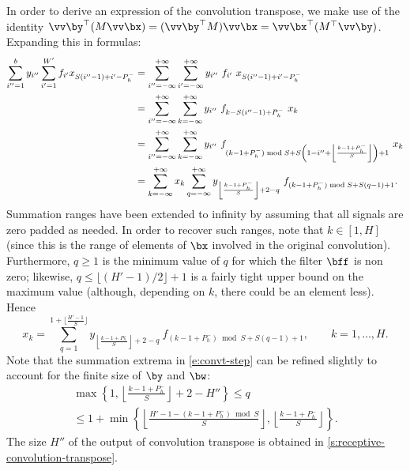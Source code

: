 In order to derive an expression of the convolution transpose,  we make use of the identity $\vv \by^\top (M \vv \bx) = (\vv \by^\top M) \vv\bx = \vv\bx^\top (M^\top \vv\by)$. Expanding this in formulas:
\begin{align*}
\sum_{i''=1}^b y_{i''} 
\sum_{i'=1}^{W'} f_{i'} x_{S (i''-1) + i'  -P_h^-}
&=
\sum_{i''=-\infty}^{+\infty}
\sum_{i'=-\infty}^{+\infty} 
y_{i''}\ f_{i'}\ x_{S (i''-1) + i'  -P_h^-}
\\
&=
\sum_{i''=-\infty}^{+\infty}
\sum_{k=-\infty}^{+\infty} 
y_{i''}\ f_{k-S(i'' -1) + P_h^-}\ x_{k}
\\
&=
\sum_{i''=-\infty}^{+\infty}
\sum_{k=-\infty}^{+\infty} 
y_{i''}%
\ %
f_{%
(k-1+ P_h^-) \bmod S +
S \left(1 -i''  + \left\lfloor \frac{k-1+ P_h^-}{S} \right\rfloor\right)+1
}\ x_{k}
\\
&=
\sum_{k=-\infty}^{+\infty} 
x_{k}
\sum_{q=-\infty}^{+\infty}
y_{\left\lfloor \frac{k-1+ P_h^-}{S} \right\rfloor + 2 - q}
\ %
f_{(k-1+ P_h^-)\bmod S +S(q - 1)+1}.
\end{align*}
Summation ranges have been extended to infinity by assuming that all signals are zero padded as needed. In order to recover such ranges, note that $k \in [1,H]$ (since this is the range of elements of $\bx$ involved in the original convolution). Furthermore, $q\geq 1$ is the minimum value of $q$ for which the filter $\bff$ is non zero; likewise, $q\leq \lfloor (H'-1)/2\rfloor +1$ is a fairly tight upper bound on the maximum value (although, depending on $k$, there could be an element less). Hence
\begin{equation}\label{e:convt-step}
 x_k = 
 \sum_{q=1}^{1 + \lfloor \frac{H'-1}{S} \rfloor}
y_{\left\lfloor \frac{k-1+ P_h^-}{S} \right\rfloor + 2 - q}\ %
f_{(k-1+ P_h^-)\bmod S +S(q - 1)+1},
\qquad k=1,\dots, H.
\end{equation}
Note that the summation extrema in \eqref{e:convt-step} can be refined slightly to account for the finite size of $\by$ and $\bw$:
\begin{multline*}
\max\left\{
1, 
\left\lfloor \frac{k-1 + P_h^-}{S} \right\rfloor + 2 - H''
\right\}
\leq q \\
\leq
1 +\min\left\{
\left\lfloor \frac{H'-1-(k-1+ P_h^-)\bmod S}{S} \right\rfloor, 
\left\lfloor \frac{k-1 + P_h^-}{S} \right\rfloor
\right\}.
\end{multline*}
The size $H''$ of the output of convolution transpose is obtained in \autoref{s:receptive-convolution-transpose}.

